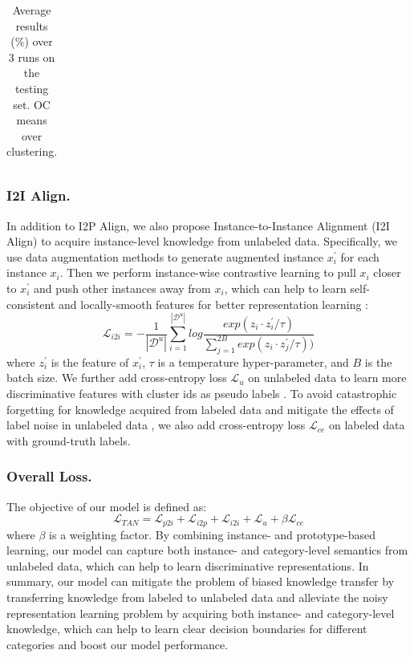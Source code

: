 \documentclass[letterpaper]{article} %
\begin{document}
\begin{table}
\begin{tabular}{lccccccccc}
\bottomrule

\end{tabular}
\caption{Average results (\%) over 3 runs on the testing set. OC means over clustering.}
\label{table1}
\end{table}










\subsubsection{I2I Align.}
In addition to I2P Align, we also propose Instance-to-Instance Alignment (I2I Align) to acquire instance-level knowledge from unlabeled data. Specifically, we use data augmentation methods to generate augmented instance $x_{i}^{\prime}$ for each instance $x_{i}$. Then we perform instance-wise contrastive learning \citep{infonce} to pull $x_{i}$ closer to $x_{i}^{\prime}$ and push other instances away from $x_{i}$, which can help to learn self-consistent and locally-smooth features for better representation learning \citep{pcl}:
\begin{equation}
\mathcal{L}_{i2i} = -\frac{1}{|\mathcal{D}^{u}|}\sum_{i=1}^{|\mathcal{D}^{u}|}log\frac{exp(z_{i} \cdot z_{i}^{\prime}/\tau)}{\sum_{j=1}^{2B}exp(z_{i} \cdot z_{j}^{\prime}/\tau))}
\end{equation}
where $z_{i}^{\prime}$ is the feature of $x_{i}^{\prime}$, $\tau$ is a temperature hyper-parameter, and $B$ is the batch size. We further add cross-entropy loss $\mathcal{L}_{u}$ on unlabeled data to learn more discriminative features with cluster ids as pseudo labels \citep{deepcluster}.
To avoid catastrophic forgetting for knowledge acquired from labeled data and mitigate the effects of label noise in unlabeled data \citep{ptjn}, we also add cross-entropy loss $\mathcal{L}_{ce}$ on labeled data with ground-truth labels.

\subsubsection{Overall Loss.} The objective of our model is defined as:
\begin{equation}
\mathcal{L}_{TAN} = \mathcal{L}_{p2i} + \mathcal{L}_{i2p} + \mathcal{L}_{i2i} + \mathcal{L}_{u} + \beta \mathcal{L}_{ce}
\end{equation}
where $\beta$ is a weighting factor. By combining instance- and prototype-based learning, our model can capture both instance- and category-level semantics from unlabeled data, which can help to learn discriminative representations.
In summary, our model can mitigate the problem of biased knowledge transfer by transferring knowledge from labeled to unlabeled data and alleviate the noisy representation learning problem by acquiring both instance- and category-level knowledge, which can help to learn clear decision boundaries for different categories and boost our model performance.
\end{document}

